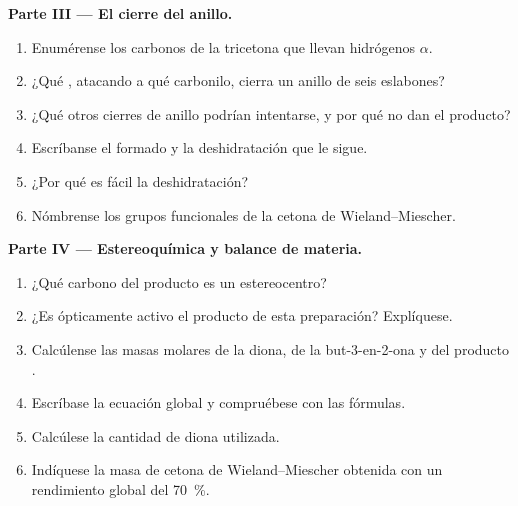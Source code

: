 \begin{problem}
\medskip
\noindent\textbf{Parte III --- El cierre del anillo.}
\begin{enumerate}[resume]
  \item Enumérense los carbonos de la tricetona que llevan hidrógenos $\alpha$.
  \item ¿Qué , atacando a qué carbonilo, cierra un anillo de seis eslabones?
  \item ¿Qué otros cierres de anillo podrían intentarse, y por qué no dan el producto?
  \item Escríbanse el  formado y la deshidratación que le sigue.
  \item ¿Por qué es fácil la deshidratación?
  \item Nómbrense los grupos funcionales de la cetona de Wieland--Miescher.
\end{enumerate}

\medskip
\noindent\textbf{Parte IV --- Estereoquímica y balance de materia.}
\begin{enumerate}[resume]
  \item ¿Qué carbono del producto es un estereocentro?
  \item ¿Es ópticamente activo el producto de esta preparación? Explíquese.
  \item Calcúlense las masas molares de la diona, de la but-3-en-2-ona y del producto
        .
  \item Escríbase la ecuación global y compruébese con las fórmulas.
  \item Calcúlese la cantidad de diona utilizada.
  \item Indíquese la masa de cetona de Wieland--Miescher obtenida con un rendimiento global del 70~\%.
\end{enumerate}
\end{problem}

